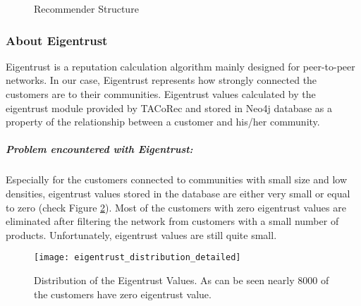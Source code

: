 \label{eigentrust_section}
	\begin{figure}[H]
		\centering
		\caption{Recommender Structure}
		\label{fig:eigentrust_structure}
	\end{figure}
	\subsubsection{About Eigentrust} \label{about_eigentrust}
	Eigentrust\cite{Eigentrust} is a reputation calculation algorithm mainly designed for peer-to-peer networks. In our case, Eigentrust represents how strongly connected the customers are to their communities. Eigentrust values calculated by the eigentrust module provided by TACoRec\cite{Tacorec} and stored in Neo4j database as a property of the relationship between a customer and his/her community. 
	\subparagraph{Problem encountered with Eigentrust:}
	Especially for the customers connected to communities with small size and low densities, eigentrust values stored in the database are either very small or equal to zero (check Figure \ref{fig:eigentrust_distribution_figure}). Most of the customers with zero eigentrust values are eliminated after filtering the network from customers with a small number of products. Unfortunately, eigentrust values ​​are still quite small.
\begin{figure}[h]
	\centering
	\texttt{[image: eigentrust\_distribution\_detailed]}
	\caption{Distribution of the Eigentrust Values. As can be seen nearly 8000 of the customers have zero eigentrust value.}
	\label{fig:eigentrust_distribution_figure}
\end{figure}
